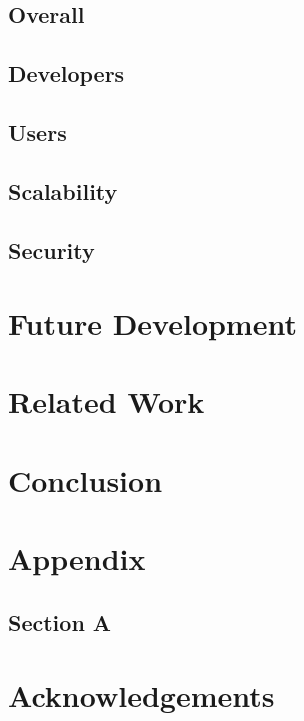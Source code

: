 \documentclass{sig-alternate}
\begin{document}
\subsection{Overall}

\subsection{Developers}

\subsection{Users}

\subsection{Scalability}

\subsection{Security}

\section{Future Development}

\section{Related Work}

\section{Conclusion}

\section{Appendix}
\subsection{Section A}
  

\section{Acknowledgements}

\nocite{*}


\end{document}
